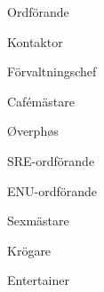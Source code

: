 \documentclass[../_main/handlingar.tex]{subfiles}
\begin{document}
\newpage
\begin{signatures}{10}
    \mvh
    \signature{Erik Månsson}{Ordförande}
    \signature{Johan Karlberg}{Kontaktor}
    \signature{Sophia Grimmeiss Grahm}{Förvaltningschef}
    \signature{Daniel Bakic}{Cafémästare}
    \signature{Niklas Gustafson}{Øverphøs}
    \signature{Edvard Carlsson}{SRE-ordförande}
    \signature{Josefine Sandström}{ENU-ordförande}
    \signature{Linnea Sjödahl}{Sexmästare}
    \signature{Markus Rahne}{Krögare}
    \signature{Albin Nyström Eklund}{Entertainer}
\end{signatures}
\end{document}
